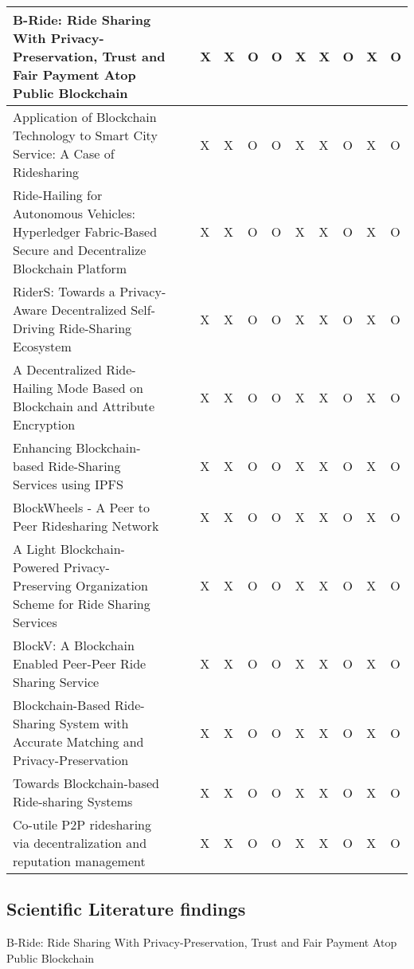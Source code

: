 \begin{longtable}{p{5cm}l||l|l|l|l|l|l|l|l|l}
B-Ride: Ride Sharing With Privacy-Preservation, Trust and Fair Payment Atop Public Blockchain & ~\cite{Baza.2021} & X & X & O & O & X & X & O & X & O \\
\hline
Application of Blockchain Technology to Smart City Service: A Case of Ridesharing & ~\cite{Chang.} & X & X & O & O & X & X & O & X & O \\
\hline
Ride-Hailing for Autonomous Vehicles: Hyperledger Fabric-Based Secure and Decentralize Blockchain Platform & ~\cite{Shivers.} & X & X & O & O & X & X & O & X & O \\
\hline
RiderS: Towards a Privacy-Aware Decentralized Self-Driving Ride-Sharing Ecosystem & ~\cite{Bathen.} & X & X & O & O & X & X & O & X & O \\
\hline
A Decentralized Ride-Hailing Mode Based on Blockchain and Attribute Encryption & ~\cite{Zhang.} & X & X & O & O & X & X & O & X & O \\
\hline
Enhancing Blockchain-based Ride-Sharing Services using IPFS & ~\cite{Mahmoud.2022} & X & X & O & O & X & X & O & X & O \\
\hline
BlockWheels - A Peer to Peer Ridesharing Network & ~\cite{Joseph.} & X & X & O & O & X & X & O & X & O \\
\hline
A Light Blockchain-Powered Privacy-Preserving Organization Scheme for Ride Sharing Services & ~\cite{Baza.52520205282020} & X & X & O & O & X & X & O & X & O \\
\hline
\pagebreak
BlockV: A Blockchain Enabled Peer-Peer Ride Sharing Service & ~\cite{Pal.} & X & X & O & O & X & X & O & X & O \\
\hline
Blockchain-Based Ride-Sharing System with Accurate Matching and Privacy-Preservation & ~\cite{Badr.} & X & X & O & O & X & X & O & X & O \\
\hline
Towards Blockchain-based Ride-sharing Systems & ~\cite{Vazquez.} & X & X & O & O & X & X & O & X & O \\
\hline
Co-utile P2P ridesharing via decentralization and reputation management & ~\cite{Sanchez.2016} & X & X & O & O & X & X & O & X & O \\
\hline
\end{longtable}

\subsection{Scientific Literature findings}

B-Ride: Ride Sharing With Privacy-Preservation, Trust and Fair Payment Atop Public Blockchain

